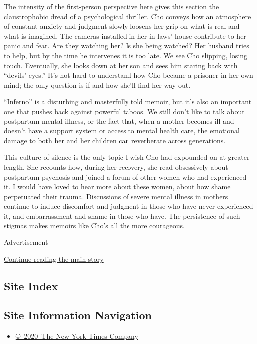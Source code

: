 The intensity of the first-person perspective here gives this section
the claustrophobic dread of a psychological thriller. Cho conveys how an
atmosphere of constant anxiety and judgment slowly loosens her grip on
what is real and what is imagined. The cameras installed in her in-laws'
house contribute to her panic and fear. Are they watching her? Is she
being watched? Her husband tries to help, but by the time he intervenes
it is too late. We see Cho slipping, losing touch. Eventually, she looks
down at her son and sees him staring back with ``devils' eyes.'' It's
not hard to understand how Cho became a prisoner in her own mind; the
only question is if and how she'll find her way out.

``Inferno'' is a disturbing and masterfully told memoir, but it's also
an important one that pushes back against powerful taboos. We still
don't like to talk about postpartum mental illness, or the fact that,
when a mother becomes ill and doesn't have a support system or access to
mental health care, the emotional damage to both her and her children
can reverberate across generations.

This culture of silence is the only topic I wish Cho had expounded on at
greater length. She recounts how, during her recovery, she read
obsessively about postpartum psychosis and joined a forum of other women
who had experienced it. I would have loved to hear more about these
women, about how shame perpetuated their trauma. Discussions of severe
mental illness in mothers continue to induce discomfort and judgment in
those who have never experienced it, and embarrassment and shame in
those who have. The persistence of such stigmas makes memoirs like Cho's
all the more courageous.

Advertisement

\protect\hyperlink{after-bottom}{Continue reading the main story}

\hypertarget{site-index}{%
\subsection{Site Index}\label{site-index}}

\hypertarget{site-information-navigation}{%
\subsection{Site Information
Navigation}\label{site-information-navigation}}

\begin{itemize}
\tightlist
\item
  \href{https://help.nytimes.com/hc/en-us/articles/115014792127-Copyright-notice}{©~2020~The
  New York Times Company}
\end{itemize}

